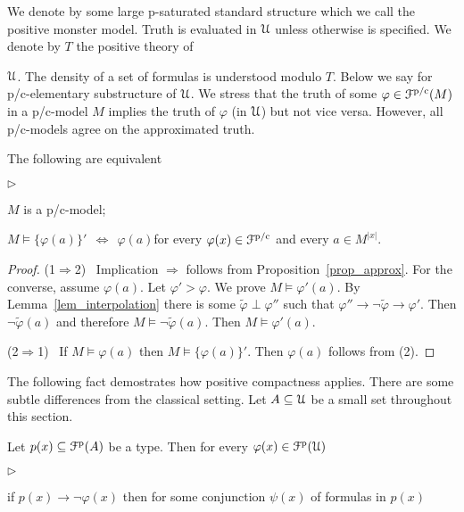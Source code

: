 \documentclass{amsproc}
\newcommand{\mylabel}[1]{{#1}\hfill}
\renewenvironment{itemize}
  {\begin{list}{$\triangleright$}{%
  \setlength{\parskip}{0mm}
  \setlength{\topsep}{.4\baselineskip}
  \setlength{\rightmargin}{0mm}
  \setlength{\listparindent}{0mm}
  \setlength{\itemindent}{0mm}
  \setlength{\labelwidth}{3ex}
  \setlength{\itemsep}{.2\baselineskip}
  \setlength{\parsep}{.2\baselineskip}
  \setlength{\partopsep}{0mm}
  \setlength{\labelsep}{1ex}
  \setlength{\leftmargin}{\labelwidth+\labelsep}
  \let\makelabel\mylabel}}{%
\end{list}}
\renewcommand*{\emph}[1]{%
   \smash{\tikz[baseline]\node[rectangle, fill=teal!25, rounded corners, inner xsep=0.5ex, inner ysep=0.2ex, anchor=base, minimum height = 2.7ex]{\strut #1};}}
\begin{document}
We denote by \emph{${\EuScript U}$\/} some large p-saturated standard structure which we call the positive monster model.
Truth is evaluated in ${\EuScript U}$ unless otherwise is specified.
We denote by $T$ the positive theory of {${\EuScript U}$.
The density of a set of formulas is understood modulo $T$.
Below we say \emph{p/c-model\/} for p/c-elementary substructure of ${\EuScript U}$.
We stress that the truth of some $\varphi\in{\EuScript F}^{\rm p/c}(M)$ in a p/c-model $M$ implies the truth of $\varphi$ (in ${\EuScript U}$) but not vice versa.
However, all p/c-models agree on the approximated truth.

\begin{fact}
  The following are equivalent 
  \begin{itemize}
    \item[1.] $M$ is a p/c-model;
    \item[2.] $M\models\big\{\varphi(a)\big\}'\ \ \Leftrightarrow\ \ \varphi(a)$\quad for every $\varphi(x)\in{\EuScript F}^{\rm p/c}$ and every $a\in M^{|x|}$.
  \end{itemize}
\end{fact}

\begin{proof}
  (1$\Rightarrow$2) \ Implication $\Rightarrow$ follows from Proposition~\ref{prop_approx}.
  For the converse, assume $\varphi(a)$.
  Let $\varphi'>\varphi$.
  We prove $M\models\varphi'(a)$.
  By Lemma~\ref{lem_interpolation} there is some $\tilde\varphi\perp\varphi''$ such that $\varphi''\rightarrow\neg\tilde\varphi\rightarrow\varphi'$.
  Then $\neg\tilde\varphi(a)$ and therefore  $M\models\neg\tilde\varphi(a)$.
  Then $M\models\varphi'(a)$.

  (2$\Rightarrow$1) \ If $M\models\varphi(a)$ then $M\models\big\{\varphi(a)\big\}'$.
  Then $\varphi(a)$ follows from (2).
\end{proof}

The following fact demostrates how positive compactness applies.
There are some subtle differences from the classical setting.
Let $A\subseteq{\EuScript U}$ be a small set throughout this section.

\begin{fact}\label{fact_compactness_imp}
  Let $p(x)\subseteq{\EuScript F}^{\rm p}(A)$ be a type.
  Then for every  $\varphi(x)\in{\EuScript F}^{\rm p}({\EuScript U})$
  \begin{itemize}
    \item[i.] if $p(x)\rightarrow\neg\varphi(x)$ then for some conjunction $\psi(x)$ of formulas in $p(x)$
    

\end{itemize}
\end{fact}}
\end{document}
